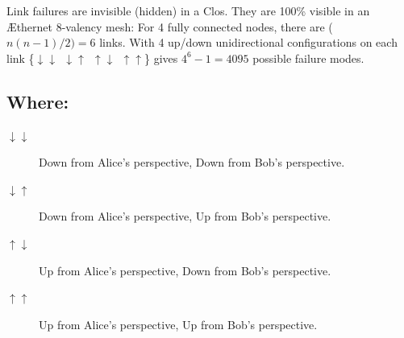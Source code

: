 \documentclass[HFT-main.tex]{subfiles}
\begin{document}
Link failures are invisible (hidden) in a Clos. They are 100\% visible in an Æthernet 8-valency mesh: For 4 fully connected nodes, there are ($n(n-1)/2) = 6$ links. With 4 up/down unidirectional configurations on each link \{$\downarrow\downarrow ~~ \downarrow\uparrow ~~ \uparrow\downarrow ~~ \uparrow\uparrow$\}
 gives $4^6-1 = 4095$ possible failure modes. 
 
 \subsection{Where:}


\begin{description}
	\item  [$\downarrow\downarrow$] Down from Alice's perspective, Down from Bob's perspective.
	\item  [$\downarrow\uparrow$] Down from Alice's perspective, Up from Bob's perspective.
	\item  [$\uparrow\downarrow$] Up from Alice's perspective, Down from Bob's perspective.
	\item  [$ \uparrow\uparrow$] Up from Alice's perspective, Up from Bob's perspective.
\end{description}

\end{document}
